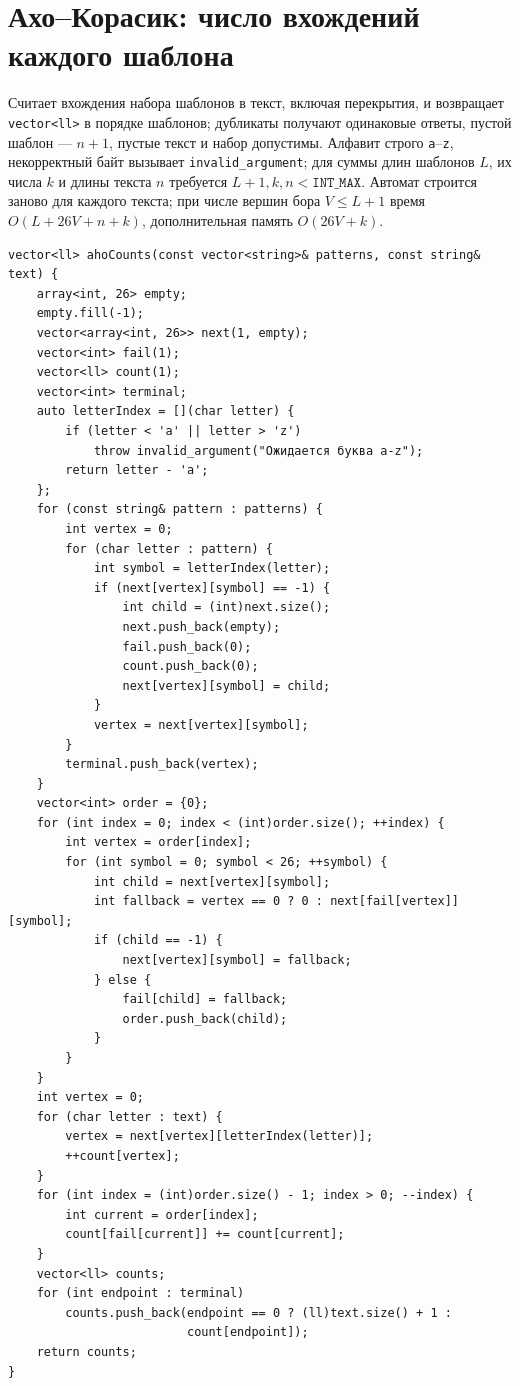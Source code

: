 \section{Ахо--Корасик: число вхождений каждого шаблона}
Считает вхождения набора шаблонов в текст, включая перекрытия, и возвращает \texttt{vector<ll>} в порядке шаблонов; дубликаты получают одинаковые ответы, пустой шаблон --- $n+1$, пустые текст и набор допустимы.
Алфавит строго \texttt{a}--\texttt{z}, некорректный байт вызывает \texttt{invalid\_argument}; для суммы длин шаблонов $L$, их числа $k$ и длины текста $n$ требуется $L+1,k,n<\texttt{INT\_MAX}$.
Автомат строится заново для каждого текста; при числе вершин бора $V\le L+1$ время $O(L+26V+n+k)$, дополнительная память $O(26V+k)$.
\begin{lstlisting}[name=str_aho]
vector<ll> ahoCounts(const vector<string>& patterns, const string& text) {
    array<int, 26> empty;
    empty.fill(-1);
    vector<array<int, 26>> next(1, empty);
    vector<int> fail(1);
    vector<ll> count(1);
    vector<int> terminal;
    auto letterIndex = [](char letter) {
        if (letter < 'a' || letter > 'z')
            throw invalid_argument("Ожидается буква a-z");
        return letter - 'a';
    };
    for (const string& pattern : patterns) {
        int vertex = 0;
        for (char letter : pattern) {
            int symbol = letterIndex(letter);
            if (next[vertex][symbol] == -1) {
                int child = (int)next.size();
                next.push_back(empty);
                fail.push_back(0);
                count.push_back(0);
                next[vertex][symbol] = child;
            }
            vertex = next[vertex][symbol];
        }
        terminal.push_back(vertex);
    }
    vector<int> order = {0};
    for (int index = 0; index < (int)order.size(); ++index) {
        int vertex = order[index];
        for (int symbol = 0; symbol < 26; ++symbol) {
            int child = next[vertex][symbol];
            int fallback = vertex == 0 ? 0 : next[fail[vertex]][symbol];
            if (child == -1) {
                next[vertex][symbol] = fallback;
            } else {
                fail[child] = fallback;
                order.push_back(child);
            }
        }
    }
    int vertex = 0;
    for (char letter : text) {
        vertex = next[vertex][letterIndex(letter)];
        ++count[vertex];
    }
    for (int index = (int)order.size() - 1; index > 0; --index) {
        int current = order[index];
        count[fail[current]] += count[current];
    }
    vector<ll> counts;
    for (int endpoint : terminal)
        counts.push_back(endpoint == 0 ? (ll)text.size() + 1 :
                         count[endpoint]);
    return counts;
}
\end{lstlisting}
